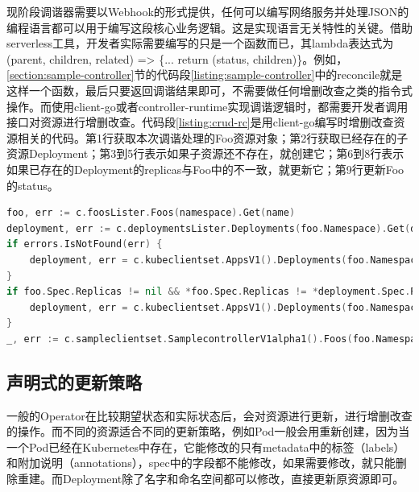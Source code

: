 \documentclass[macfonts,master]{njuthesis}
\begin{document}
现阶段调谐器需要以Webhook的形式提供，任何可以编写网络服务并处理JSON的编程语言都可以用于编写这段核心业务逻辑。这是实现语言无关特性的关键。借助serverless工具，开发者实际需要编写的只是一个函数而已，其lambda表达式为(parent, children, related) => \{... return (status, children)\}。例如，\ref{section:sample-controller}节的代码段\ref{listing:sample-controller}中的reconcile就是这样一个函数，最后只要返回调谐结果即可，不需要做任何增删改查之类的指令式操作。而使用client-go或者controller-runtime实现调谐逻辑时，都需要开发者调用接口对资源进行增删改查。代码段\ref{listing:crud-rc}是用client-go编写时增删改查资源相关的代码。第1行获取本次调谐处理的Foo资源对象；第2行获取已经存在的子资源Deployment；第3到5行表示如果子资源还不存在，就创建它；第6到8行表示如果已存在的Deployment的replicas与Foo中的不一致，就更新它；第9行更新Foo的status。
\begin{lstlisting}[language=Go,caption=sample-controller中对资源进行增删改查的代码段,label=listing:crud-rc]
foo, err := c.foosLister.Foos(namespace).Get(name)
deployment, err := c.deploymentsLister.Deployments(foo.Namespace).Get(deploymentName)
if errors.IsNotFound(err) {
    deployment, err = c.kubeclientset.AppsV1().Deployments(foo.Namespace).Create(context.TODO(), newDeployment(foo), metav1.CreateOptions{})
}
if foo.Spec.Replicas != nil && *foo.Spec.Replicas != *deployment.Spec.Replicas {
    deployment, err = c.kubeclientset.AppsV1().Deployments(foo.Namespace).Update(context.TODO(), newDeployment(foo), metav1.UpdateOptions{})
}
_, err := c.sampleclientset.SamplecontrollerV1alpha1().Foos(foo.Namespace).Update(context.TODO(), fooCopy, metav1.UpdateOptions{})
\end{lstlisting}



\subsection{声明式的更新策略}

一般的Operator在比较期望状态和实际状态后，会对资源进行更新，进行增删改查的操作。而不同的资源适合不同的更新策略，例如Pod一般会用重新创建，因为当一个Pod已经在Kubernetes中存在，它能修改的只有metadata中的标签（labels）和附加说明（annotations），spec中的字段都不能修改，如果需要修改，就只能删除重建。而Deployment除了名字和命名空间都可以修改，直接更新原资源即可。
\end{document}
